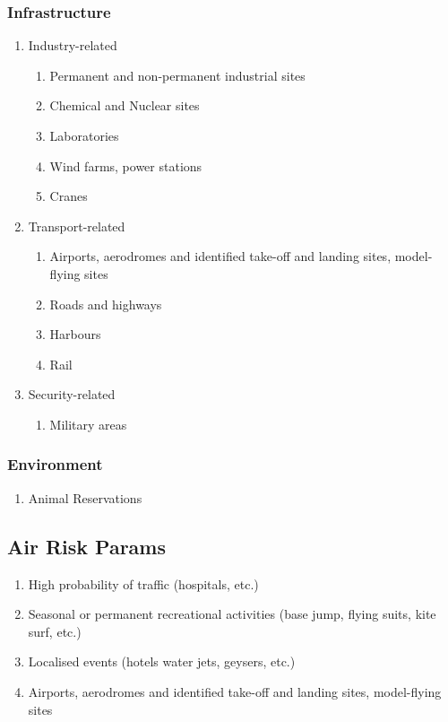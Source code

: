 \documentclass{ua_wgs_base}
\begin{document}
\subsubsection{Infrastructure}
\begin{enumerate}
\item Industry-related
\begin{enumerate}
\item Permanent and non-permanent industrial sites
\item Chemical and Nuclear sites
\item Laboratories
\item Wind farms, power stations
\item Cranes
\end{enumerate}
\item Transport-related
\begin{enumerate}
\item Airports, aerodromes and identified take-off and landing sites, model-flying
sites
\item Roads and highways
\item Harbours
\item Rail
\end{enumerate}
\item Security-related
\begin{enumerate}
\item Military areas
\end{enumerate}
\end{enumerate}

\subsubsection{Environment}
\begin{enumerate}
\item Animal Reservations
\end{enumerate}

\subsection{Air Risk Params}
\begin{enumerate}
\item High probability of traffic (hospitals, etc.) 
\item Seasonal or permanent recreational activities (base jump, flying suits,
kite surf, etc.) 
\item Localised events (hotels water jets, geysers, etc.)
\item Airports, aerodromes and identified take-off and landing sites, model-flying
sites
\end{enumerate}
\end{document}
